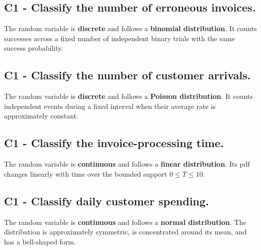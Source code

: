 {		
		\label{subsec:distribution-recognition-operations-c1-a}
		\subsection*{C1 - Classify the number of erroneous invoices. }
		The random variable is \textbf{discrete} and follows a \textbf{binomial distribution}. It counts successes across a fixed number of independent binary trials with the same success probability.
		
		\label{subsec:distribution-recognition-operations-c1-b}
		\subsection*{C1 - Classify the number of customer arrivals. }
		The random variable is \textbf{discrete} and follows a \textbf{Poisson distribution}. It counts independent events during a fixed interval when their average rate is approximately constant.
		
		\label{subsec:distribution-recognition-operations-c1-c}
		\subsection*{C1 - Classify the invoice-processing time. }
		The random variable is \textbf{continuous} and follows a \textbf{linear distribution}. Its pdf changes linearly with time over the bounded support $0\le T\le10$.
		
		\label{subsec:distribution-recognition-operations-c1-d}
		\subsection*{C1 - Classify daily customer spending. }
		The random variable is \textbf{continuous} and follows a \textbf{normal distribution}. The distribution is approximately symmetric, is concentrated around its mean, and has a bell-shaped form.
	}
	
	
